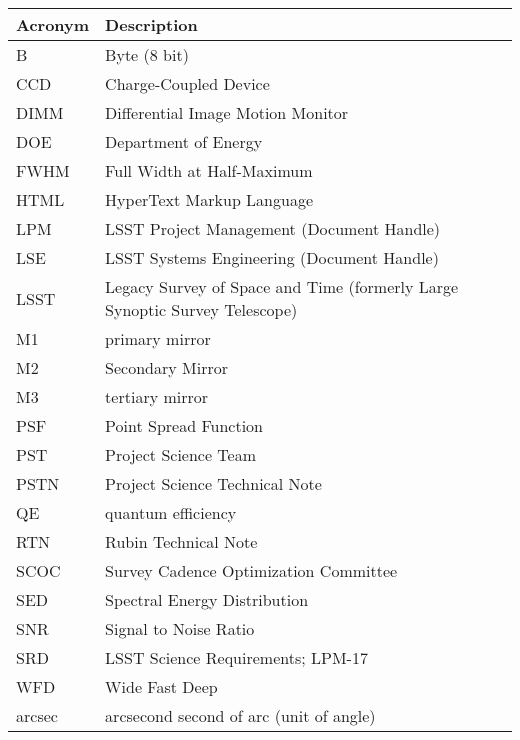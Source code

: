 \addtocounter{table}{-1}
\begin{longtable}{p{}p{}}\hline
\textbf{Acronym} & \textbf{Description}  \\\hline

B & Byte (8 bit) \\\hline
CCD & Charge-Coupled Device \\\hline
DIMM & Differential Image Motion Monitor \\\hline
DOE & Department of Energy \\\hline
FWHM & Full Width at Half-Maximum \\\hline
HTML & HyperText Markup Language \\\hline
LPM & LSST Project Management (Document Handle) \\\hline
LSE & LSST Systems Engineering (Document Handle) \\\hline
LSST & Legacy Survey of Space and Time (formerly Large Synoptic Survey Telescope) \\\hline
M1 & primary mirror \\\hline
M2 & Secondary Mirror \\\hline
M3 & tertiary mirror \\\hline
PSF & Point Spread Function \\\hline
PST & Project Science Team \\\hline
PSTN & Project Science Technical Note \\\hline
QE & quantum efficiency \\\hline
RTN & Rubin Technical Note \\\hline
SCOC & Survey Cadence Optimization Committee \\\hline
SED & Spectral Energy Distribution \\\hline
SNR & Signal to Noise Ratio \\\hline
SRD & LSST Science Requirements; LPM-17 \\\hline
WFD & Wide Fast Deep \\\hline
arcsec & arcsecond second of arc (unit of angle) \\\hline
\end{longtable}

